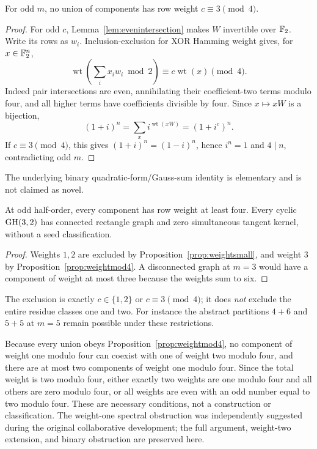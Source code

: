 \begin{proposition}\label{prop:weightmod4}
For odd $m$, no union of components has row weight $c\equiv3\pmod4$.
\end{proposition}
\begin{proof}
For odd $c$, Lemma~\ref{lem:evenintersection} makes $W$ invertible over $\mathbb F_2$. Write its rows as $w_i$. Inclusion-exclusion for XOR Hamming weight gives, for $x\in\mathbb F_2^n$,
\[
 \operatorname{wt}\left(\sum_ix_iw_i\bmod2\right)
 \equiv c\operatorname{wt}(x)\pmod4.
\]
Indeed pair intersections are even, annihilating their coefficient-two terms modulo four, and all higher terms have coefficients divisible by four. Since $x\mapsto xW$ is a bijection,
\[
 (1+i)^n=\sum_xi^{\operatorname{wt}(xW)}=(1+i^c)^n.
\]
If $c\equiv3\pmod4$, this gives $(1+i)^n=(1-i)^n$, hence $i^n=1$ and $4\mid n$, contradicting odd $m$.
\end{proof}
The underlying binary quadratic-form/Gauss-sum identity is elementary and is not claimed as novel.

\begin{corollary}\label{cor:m3}
At odd half-order, every component has row weight at least four. Every cyclic $\operatorname{GH}(3,2)$ has connected rectangle graph and zero simultaneous tangent kernel, without a seed classification.
\end{corollary}
\begin{proof}
Weights $1,2$ are excluded by Proposition~\ref{prop:weightsmall}, and weight $3$ by Proposition~\ref{prop:weightmod4}. A disconnected graph at $m=3$ would have a component of weight at most three because the weights sum to six.
\end{proof}
The exclusion is exactly $c\in\{1,2\}$ or $c\equiv3\pmod4$; it does \emph{not} exclude the entire residue classes one and two. For instance the abstract partitions $4+6$ and $5+5$ at $m=5$ remain possible under these restrictions.

Because every union obeys Proposition~\ref{prop:weightmod4}, no component of weight one modulo four can coexist with one of weight two modulo four, and there are at most two components of weight one modulo four. Since the total weight is two modulo four, either exactly two weights are one modulo four and all others are zero modulo four, or all weights are even with an odd number equal to two modulo four. These are necessary conditions, not a construction or classification. The weight-one spectral obstruction was independently suggested during the original collaborative development; the full argument, weight-two extension, and binary obstruction are preserved here.
